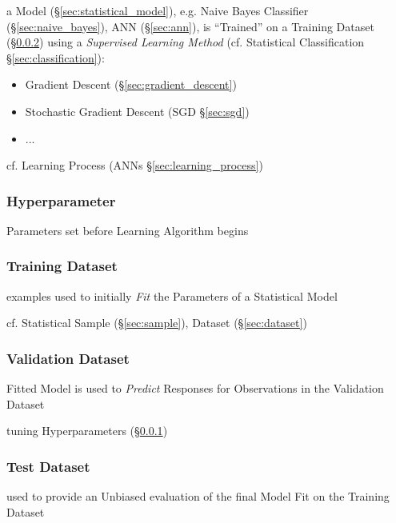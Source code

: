 a Model (\S\ref{sec:statistical_model}), e.g. Naive Bayes Classifier
(\S\ref{sec:naive_bayes}), ANN (\S\ref{sec:ann}), is ``Trained'' on a Training
Dataset (\S\ref{sec:training_dataset}) using a \emph{Supervised Learning Method}
(cf. Statistical Classification \S\ref{sec:classification}):
\begin{itemize}
  \item Gradient Descent (\S\ref{sec:gradient_descent})
  \item Stochastic Gradient Descent (SGD \S\ref{sec:sgd})
  \item ...
\end{itemize}

\fist cf. Learning Process (ANNs \S\ref{sec:learning_process})



\subsubsection{Hyperparameter}\label{sec:hyperparameter}

Parameters set before Learning Algorithm begins



\subsubsection{Training Dataset}\label{sec:training_dataset}

examples used to initially \emph{Fit} the Parameters of a Statistical Model

cf. Statistical Sample (\S\ref{sec:sample}), Dataset (\S\ref{sec:dataset})



\subsubsection{Validation Dataset}\label{sec:validation_dataset}

Fitted Model is used to \emph{Predict} Responses for Observations in the
Validation Dataset

tuning Hyperparameters (\S\ref{sec:hyperparameter})



\subsubsection{Test Dataset}\label{sec:test_dataset}

used to provide an Unbiased evaluation of the final Model Fit on the Training
Dataset



